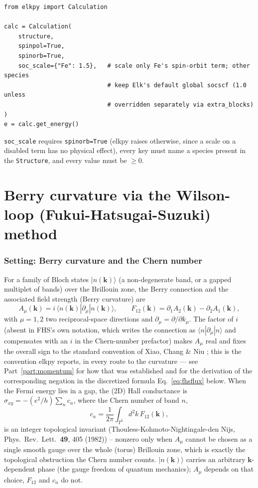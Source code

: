 \documentclass[11pt]{article}
\begin{document}
\begin{verbatim}
from elkpy import Calculation

calc = Calculation(
    structure,
    spinpol=True,
    spinorb=True,
    soc_scale={"Fe": 1.5},   # scale only Fe's spin-orbit term; other species
                             # keep Elk's default global socscf (1.0 unless
                             # overridden separately via extra_blocks)
)
e = calc.get_energy()
\end{verbatim}
\texttt{soc\_scale} requires \texttt{spinorb=True} (elkpy raises otherwise, since a
scale on a disabled term has no physical effect), every key must name a species present
in the \texttt{Structure}, and every value must be $\geq 0$.

\part{Berry curvature via the Wilson-loop (Fukui-Hatsugai-Suzuki) method}
\label{part:berry}

\section{Setting: Berry curvature and the Chern number}

For a family of Bloch states $|n(\mathbf k)\rangle$ (a non-degenerate band, or a
gapped multiplet of bands) over the Brillouin zone, the Berry connection and the
associated field strength (Berry curvature) are
\begin{equation}
  A_\mu(\mathbf k) = i\,\langle n(\mathbf k) | \partial_\mu | n(\mathbf k) \rangle, \qquad
  F_{12}(\mathbf k) = \partial_1 A_2(\mathbf k) - \partial_2 A_1(\mathbf k),
  \label{eq:berry}
\end{equation}
with $\mu=1,2$ two reciprocal-space directions and $\partial_\mu = \partial/\partial
k_\mu$. The factor of $i$ (absent in FHS's own notation, which writes the connection as
$\langle n|\partial_\mu|n\rangle$ and compensates with an $i$ in the Chern-number
prefactor) makes $A_\mu$ real and fixes the overall sign to the standard convention of
Xiao, Chang \& Niu \cite{xiaochangniu2010}; this is the convention elkpy reports, in every
route to the curvature --- see Part~\ref{part:momentum} for how that was established and
for the derivation of the corresponding negation in the discretized formula
Eq.~\eqref{eq:fhsflux} below. When the Fermi energy lies in a gap, the (2D) Hall
conductance is $\sigma_{xy} = -(e^2/h)\sum_n c_n$, where the Chern number of band $n$,
\begin{equation}
  c_n = \frac{1}{2\pi} \int_{T^2} d^2k\, F_{12}(\mathbf k),
  \label{eq:chern}
\end{equation}
is an integer topological invariant (Thouless-Kohmoto-Nightingale-den Nijs,
Phys.\ Rev.\ Lett.\ \textbf{49}, 405 (1982)) -- nonzero only when $A_\mu$ cannot be
chosen as a single smooth gauge over the whole (torus) Brillouin zone, which is exactly
the topological obstruction the Chern number counts. $|n(\mathbf k)\rangle$ carries an
arbitrary $\mathbf k$-dependent phase (the gauge freedom of quantum mechanics);
$A_\mu$ depends on that choice, $F_{12}$ and $c_n$ do not.
\end{document}
